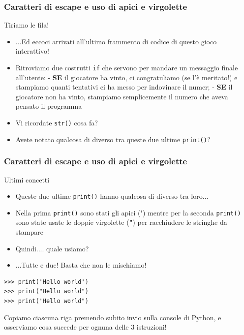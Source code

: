 \documentclass{beamer}
\begin{document}
\begin{frame}[fragile]
\frametitle{Caratteri di escape e uso di apici e virgolette}
	\begin{block}{Tiriamo le fila!}
		\begin{itemize}
			\item ...Ed eccoci arrivati all'ultimo frammento di codice di questo gioco interattivo!
			\item Ritroviamo due costrutti \texttt{if} che servono per mandare un messaggio finale all'utente:\newline
			- \textbf{SE} il giocatore ha vinto, ci congratuliamo (se l'è meritato!) e stampiamo quanti tentativi ci ha messo per indovinare il numer;\newline
			- \textbf{SE} il giocatore non ha vinto, stampiamo semplicemente il numero che aveva pensato il programma
			\item Vi ricordate \texttt{str()} cosa fa?
			\item Avete notato qualcosa di diverso tra queste due ultime \texttt{print()}?
		\end{itemize}
	\end{block}
\end{frame}

\begin{frame}[fragile]
\frametitle{Caratteri di escape e uso di apici e virgolette}
\begin{block}{Ultimi concetti}
	\begin{itemize}
		\item Queste due ultime \texttt{print()} hanno qualcosa di diverso tra loro...
		\item Nella prima \texttt{print()} sono stati gli apici (\textbf{'}) mentre per la seconda  \texttt{print()} sono state usate le doppie virgolette (\textbf{"}) per racchiudere le stringhe da stampare
		\item Quindi.... quale usiamo?
		\item ...Tutte e due! Basta che non le mischiamo!
	\end{itemize}
\end{block}
\begin{lstlisting}
>>> print('Hello world')
>>> print("Hello world")
>>> print('Hello world")
\end{lstlisting}
Copiamo ciascuna riga premendo subito invio sulla console di Python, e osserviamo cosa succede per ognuna delle 3 istruzioni!
\end{frame}
\end{document}
